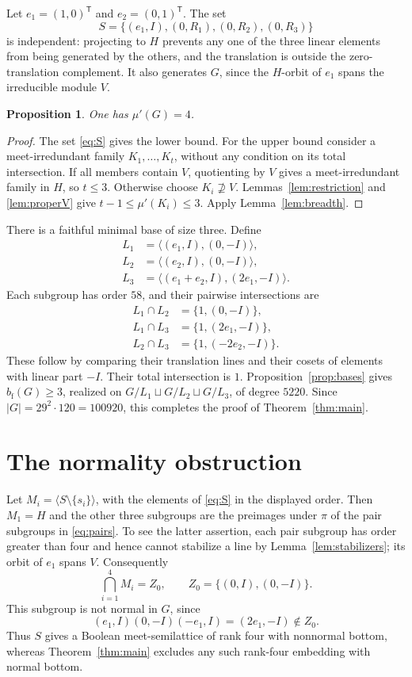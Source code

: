 \IfFileExists{baustms.cls}{\bulletinformattrue\documentclass[plain]{baustms}}{\bulletinformatfalse\documentclass[11pt]{amsart}}
\theoremstyle{cupthm}
\newtheorem{proposition}[theorem]{Proposition}
\newcommand{\mup}{\mu'}
\newcommand{\bfth}{b_{\mathrm f}}
\begin{document}
Let $e_1=(1,0)^{\mathsf T}$ and $e_2=(0,1)^{\mathsf T}$.
The set
\begin{equation}\label{eq:S}
 S=\{(e_1,I),(0,R_1),(0,R_2),(0,R_3)\}
\end{equation}
is independent: projecting to $H$ prevents any one of the three linear
elements from being generated by the others, and the translation is
outside the zero-translation complement. It also generates $G$, since
the $H$-orbit of $e_1$ spans the irreducible module $V$.

\begin{proposition}\label{prop:mu}
One has $\mup(G)=4$.
\end{proposition}
\begin{proof}
The set \eqref{eq:S} gives the lower bound. For the upper bound consider
a meet-irredundant family $K_1,\ldots,K_t$, without any condition on its
total intersection. If all members contain $V$, quotienting by $V$
gives a meet-irredundant family in $H$, so $t\le3$.
Otherwise choose $K_i\not\supseteq V$. Lemmas~\ref{lem:restriction}
and \ref{lem:properV} give $t-1\le\mup(K_i)\le3$.
Apply Lemma~\ref{lem:breadth}.
\end{proof}

There is a faithful minimal base of size three. Define
\[
\begin{split}
 L_1&=\langle(e_1,I),(0,-I)\rangle,\\
 L_2&=\langle(e_2,I),(0,-I)\rangle,\\
 L_3&=\langle(e_1+e_2,I),(2e_1,-I)\rangle.
\end{split}
\]
Each subgroup has order $58$, and their pairwise intersections are
\[
\begin{split}
 L_1\cap L_2&=\{1,(0,-I)\},\\
 L_1\cap L_3&=\{1,(2e_1,-I)\},\\
 L_2\cap L_3&=\{1,(-2e_2,-I)\}.
\end{split}
\]
These follow by comparing their translation lines and their cosets of
elements with linear part $-I$. Their total intersection is $1$.
Proposition~\ref{prop:bases} gives $\bfth(G)\ge3$, realized on
$G/L_1\sqcup G/L_2\sqcup G/L_3$, of degree $5220$.
Since $|G|=29^2\cdot120=100920$, this completes the proof of
Theorem~\ref{thm:main}.

\section{The normality obstruction}
Let $M_i=\langle S\setminus\{s_i\}\rangle$, with the elements of
\eqref{eq:S} in the displayed order. Then $M_1=H$ and the other
three subgroups are the preimages under $\pi$ of the pair subgroups
in \eqref{eq:pairs}. To see the latter assertion, each pair subgroup
has order greater than four and hence cannot stabilize a line by
Lemma~\ref{lem:stabilizers}; its orbit of $e_1$ spans $V$.
Consequently
\[
 \bigcap_{i=1}^4 M_i=Z_0,\qquad
 Z_0=\{(0,I),(0,-I)\}.
\]
This subgroup is not normal in $G$, since
\[
 (e_1,I)(0,-I)(-e_1,I)=(2e_1,-I)\notin Z_0.
\]
Thus $S$ gives a Boolean meet-semilattice of rank four with nonnormal
bottom, whereas Theorem~\ref{thm:main} excludes any such rank-four
embedding with normal bottom.
\end{document}
